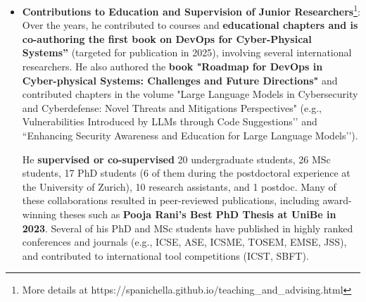 \documentclass[11pt]{article}
\begin{document}
\begin{itemize}
  \vspace{-2mm}
  \item 
  \textbf{Contributions to Education and Supervision of Junior Researchers}\footnote{More details at https://spanichella.github.io/teaching\_and\_advising.html}:  
Over the years, he contributed to courses and \textbf{educational chapters and is co-authoring the first book on DevOps for Cyber-Physical Systems''} (targeted for publication in 2025), involving several international researchers. He also authored the \textbf{book "Roadmap for DevOps in Cyber-physical Systems: Challenges and Future Directions"} and contributed chapters in the volume "Large Language Models in Cybersecurity and Cyberdefense: Novel Threats and Mitigations Perspectives" (e.g., Vulnerabilities Introduced by LLMs through Code Suggestions’’ and ``Enhancing Security Awareness and Education for Large Language Models’’). 

He \textbf{supervised or co-supervised} 20 undergraduate students, 26 MSc students, 17 PhD students (6 of them during the postdoctoral experience at the University of Zurich), 10 research assistants, and 1 postdoc. Many of these collaborations resulted in peer-reviewed publications, including award-winning theses such as \textbf{Pooja Rani’s Best PhD Thesis at UniBe in 2023}. Several of his PhD and MSc students have published in highly ranked conferences and journals (e.g., ICSE, ASE, ICSME, TOSEM, EMSE, JSS), and contributed to international tool competitions (ICST, SBFT). 


\end{itemize}
\end{document}
